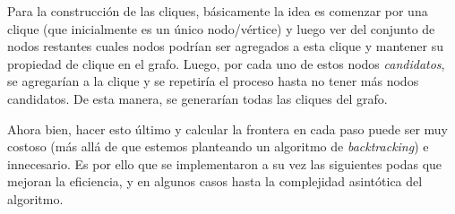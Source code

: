 \par Para la construcci\'on de las cliques, b\'asicamente la idea es comenzar por
    una clique (que inicialmente es un \'unico nodo/v\'ertice) y luego ver del conjunto
    de nodos restantes cuales nodos podr\'ian ser agregados a esta clique y mantener
    su propiedad de clique en el grafo. Luego, por cada uno de estos nodos \emph{%
    candidatos}, se agregar\'ian a la clique y se repetir\'ia el proceso hasta no tener
    m\'as nodos candidatos. De esta manera, se generar\'ian todas las cliques del grafo.

\par Ahora bien, hacer esto \'ultimo y calcular la frontera en cada paso puede ser
    muy costoso (m\'as all\'a de que estemos planteando un algoritmo de \emph{backtracking})
    e innecesario. Es por ello que se implementaron a su vez las siguientes podas
    que mejoran la eficiencia, y en algunos casos hasta la complejidad asint\'otica del
    algoritmo.

